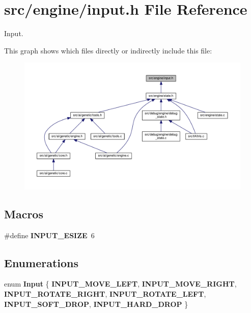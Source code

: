\section{src/engine/input.h File Reference}
\label{input_8h}


Input.  


This graph shows which files directly or indirectly include this file\+:
\nopagebreak
\begin{figure}[H]
\begin{center}
\leavevmode
\includegraphics[width=350pt]{input_8h__dep__incl}
\end{center}
\end{figure}
\subsection*{Macros}
\begin{DoxyCompactItemize}
\item 
\#define \textbf{ I\+N\+P\+U\+T\+\_\+\+E\+S\+I\+ZE}~6
\end{DoxyCompactItemize}
\subsection*{Enumerations}
\begin{DoxyCompactItemize}
\item 
enum \textbf{ Input} \{ \newline
\textbf{ I\+N\+P\+U\+T\+\_\+\+M\+O\+V\+E\+\_\+\+L\+E\+FT}, 
\textbf{ I\+N\+P\+U\+T\+\_\+\+M\+O\+V\+E\+\_\+\+R\+I\+G\+HT}, 
\textbf{ I\+N\+P\+U\+T\+\_\+\+R\+O\+T\+A\+T\+E\+\_\+\+R\+I\+G\+HT}, 
\textbf{ I\+N\+P\+U\+T\+\_\+\+R\+O\+T\+A\+T\+E\+\_\+\+L\+E\+FT}, 
\newline
\textbf{ I\+N\+P\+U\+T\+\_\+\+S\+O\+F\+T\+\_\+\+D\+R\+OP}, 
\textbf{ I\+N\+P\+U\+T\+\_\+\+H\+A\+R\+D\+\_\+\+D\+R\+OP}
 \}
\end{DoxyCompactItemize}


